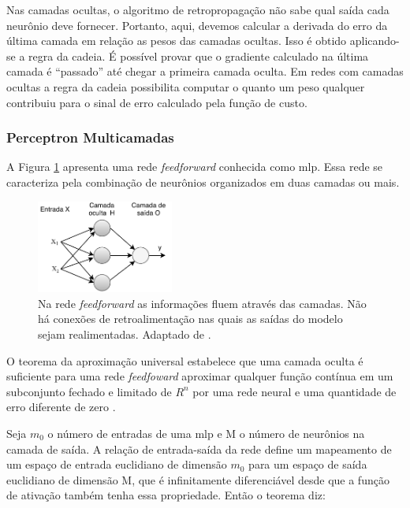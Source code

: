 Nas camadas ocultas, o algoritmo de retropropagação não sabe qual saída cada neurônio deve fornecer. Portanto, aqui, devemos calcular a derivada do erro da última camada em relação as pesos das camadas ocultas. Isso é obtido aplicando-se a regra da cadeia. É possível provar que o gradiente calculado na última camada é ``passado'' até chegar a primeira camada oculta.    
Em redes com camadas ocultas a regra da cadeia possibilita computar o quanto um peso qualquer contribuiu para o sinal de erro calculado pela função de custo.  

\subsubsection{Perceptron Multicamadas}

A Figura \ref{fig:feedforward} apresenta uma rede \textit{feedforward} conhecida como \gls{mlp}. Essa rede se caracteriza pela combinação de neurônios organizados em duas camadas ou mais. 

\begin{figure}[h]
	\centering
	\includegraphics[width=0.4\textwidth]{figuras/feedforward.pdf}
	\caption[Rede \textit{feedforward} de 2 camadas]{Na rede \textit{feedforward} as informações fluem através das camadas. Não há conexões de retroalimentação nas quais as saídas do modelo sejam realimentadas. Adaptado de \cite{Goodfellow2016}.}
	\label{fig:feedforward}
\end{figure}


O teorema da aproximação universal \cite{hornik1989multilayer} estabelece que uma camada oculta é suficiente para uma rede \textit{feedfoward} aproximar qualquer função contínua em um subconjunto fechado e limitado de $R^{n}$ por uma rede neural e uma quantidade de erro diferente de zero \cite{Goodfellow2016}.

Seja $m_{0}$ o número de entradas de uma \acrshort{mlp} e M o número de neurônios na camada de saída. A relação de entrada-saída da rede define um mapeamento de um espaço de entrada euclidiano de dimensão $m_{0}$ para um espaço de saída euclidiano de dimensão M, que é infinitamente diferenciável desde que a função de ativação também tenha essa propriedade. Então o teorema diz:

